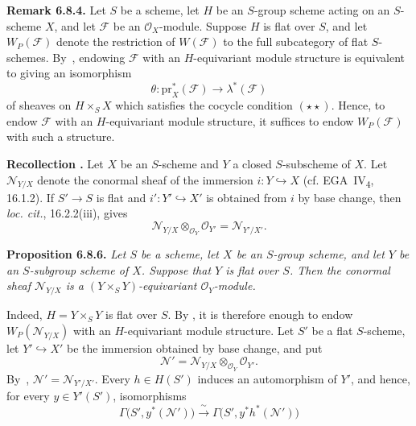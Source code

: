 \medskip
\noindent{}\textbf{Remark 6.8.4.}
Let \(S\) be a scheme, let \(H\) be an \(S\)-group scheme acting on an
\(S\)-scheme \(X\), and let \(\mathcal F\) be an
\(\mathcal O_X\)-module. Suppose \(H\) is flat over \(S\), and let
\(W_P(\mathcal F)\) denote the restriction of \(W(\mathcal F)\) to the
full subcategory of flat \(S\)-schemes. By~, endowing
\(\mathcal F\) with an \(H\)-equivariant module structure is equivalent
to giving an isomorphism
\[
  \theta:\mathrm{pr}_X^*(\mathcal F)\longrightarrow\lambda^*(\mathcal F)
\]
of sheaves on \(H\times_SX\) which satisfies the cocycle condition
\((\star\star)\). Hence, to endow \(\mathcal F\) with an
\(H\)-equivariant module structure, it suffices to endow
\(W_P(\mathcal F)\) with such a structure.

\medskip
{}\noindent\textbf{Recollection .}
Let \(X\) be an \(S\)-scheme and \(Y\) a closed \(S\)-subscheme of
\(X\). Let \(\mathcal N_{Y/X}\) denote the conormal sheaf of the
immersion \(i:Y\hookrightarrow X\) (cf. EGA~IV\textsubscript{4},
16.1.2). If \(S'\to S\) is flat and
\(i':Y'\hookrightarrow X'\) is obtained from \(i\) by base change,
then \emph{loc. cit.}, 16.2.2(iii), gives
\[
  \mathcal N_{Y/X}\otimes_{\mathcal O_Y}\mathcal O_{Y'}
  =\mathcal N_{Y'/X'}.
\]

\medskip
\noindent{}\textbf{Proposition 6.8.6.}
\textit{Let \(S\) be a scheme, let \(X\) be an \(S\)-group scheme, and
let \(Y\) be an \(S\)-subgroup scheme of \(X\). Suppose that \(Y\) is
flat over \(S\). Then the conormal sheaf \(\mathcal N_{Y/X}\) is a
\((Y\times_SY)\)-equivariant \(\mathcal O_Y\)-module.}

Indeed, \(H=Y\times_SY\) is flat over \(S\). By , it is
therefore enough to endow \(W_P(\mathcal N_{Y/X})\) with an
\(H\)-equivariant module structure. Let \(S'\) be a flat \(S\)-scheme,
let \(Y'\hookrightarrow X'\) be the immersion obtained by base change,
and put
\[
  \mathcal N'
  =\mathcal N_{Y/X}\otimes_{\mathcal O_Y}\mathcal O_{Y'}.
\]
By~, \(\mathcal N'=\mathcal N_{Y'/X'}\).
Every \(h\in H(S')\) induces an automorphism of \(Y'\), and hence, for
every \(y\in Y'(S')\), isomorphisms
\[
  \Gamma\bigl(S',y^*(\mathcal N')\bigr)
  \xrightarrow{\ \sim\ }
  \Gamma\bigl(S',y^*h^*(\mathcal N')\bigr)
\]

